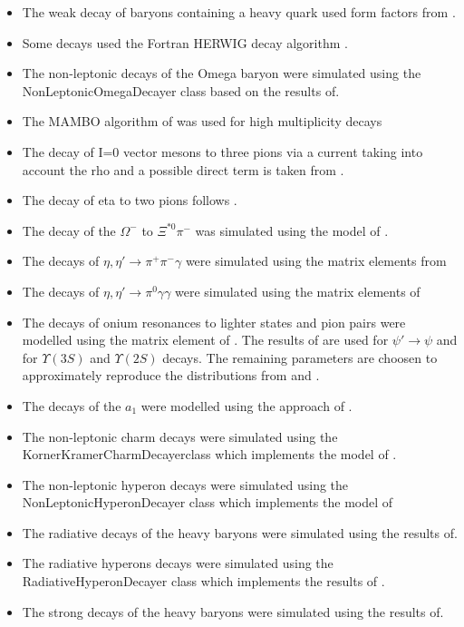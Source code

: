 \documentclass{article}
\begin{document}
\begin{itemize}
\item The weak decay of baryons containing a heavy quark used form factors from \cite{Cheng:1995fe,Cheng:1996cs}.
\item Some decays used the Fortran HERWIG decay algorithm \cite{Corcella:2000bw}.
\item The  non-leptonic decays of the Omega baryon were simulated using the NonLeptonicOmegaDecayer class based on the results of\cite{Borasoy:1999ip}.
\item The MAMBO algorithm of \cite{Kleiss:1991rn} was used for high multiplicity decays
\item The decay of I=0 vector mesons to three pions via a current taking into account the rho and a possible direct term is taken from \cite{Aloisio:2003ur}.
\item The decay of eta to two pions follows \cite{Beisert:2003zs,Gormley:1970qz,Tippens:2001fm}.
\item The decay of the $\Omega^-$ to $\Xi^{*0}\pi^-$ was simulated using the model of \cite{Duplancic:2004dy}.
\item The decays of $\eta,\eta'\to\pi^+\pi^-\gamma$ were simulated using the matrix elements from \cite{Venugopal:1998fq,Holstein:2001bt}
\item The decays of $\eta,\eta'\to\pi^0\gamma\gamma$ were simulated using the matrix elements of \cite{Holstein:2001bt}
\item The decays of onium resonances to lighter states and pion pairs were modelled using the matrix element of \cite{Brown:1975dz}. The results of \cite{Bai:1999mj} are used for $\psi'\to\psi$ and \cite{Cronin-Hennessy:2007sj} for $\Upsilon(3S)$ and $\Upsilon(2S)$ decays. The remaining parameters are choosen to approximately reproduce the distributions from \cite{Aubert:2006bm} and \cite{Adam:2005mr}.
\item The decays of the $a_1$ were modelled using the approach of \cite{Kuhn:1990ad}.

\item The non-leptonic charm decays were simulated using the KornerKramerCharmDecayerclass which implements the model of \cite{Korner:1992wi}.
\item The non-leptonic hyperon decays were simulated using the NonLeptonicHyperonDecayer class which implements the model of\cite{Borasoy:1999md}
\item The radiative decays of the heavy baryons were simulated using the results of\cite{Ivanov:1999bk,Ivanov:1998wj}.
\item The radiative hyperons decays were simulated using the RadiativeHyperonDecayer class which implements the results of \cite{Borasoy:1999nt}.
\item The strong decays of the heavy baryons were simulated using the results of\cite{Ivanov:1999bk}.
\end{itemize}
\end{document}
